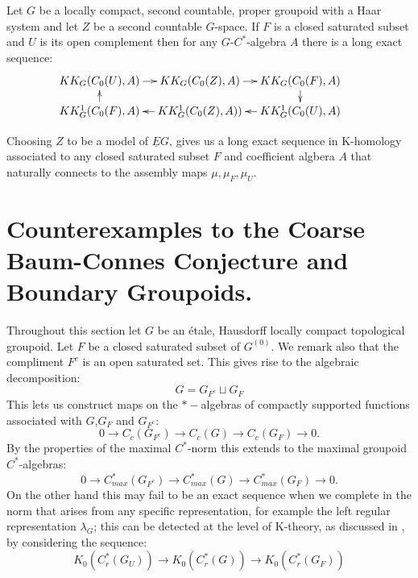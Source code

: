 \begin{conjecture}
{\begin{lemma}
Let $G$ be a locally compact, second countable, proper groupoid with a Haar system and let $Z$ be a second countable $G$-space. If $F$ is a closed saturated subset and $U$ is its open complement then for any $G$-$C^{*}$-algebra $A$ there is a long exact sequence:
\begin{equation*}
\xymatrix@=1em{
KK_{G}(C_{0}(U),A) \ar[r] & KK_{G}(C_{0}(Z),A) \ar[r]& KK_{G}(C_{0}(F),A)\ar[d] & \\
KK^{1}_{G}(C_{0}(F),A)\ar[u]& KK^{1}_{G}(C_{0}(Z),A)) \ar[l]& KK^{1}_{G}(C_{0}(U),A)\ar[l] &
}
\end{equation*}
\end{lemma}

Choosing $Z$ to be a model of $\underline{E}G$, gives us a long exact sequence in K-homology associated to any closed saturated subset $F$ and coefficient algbera $A$ that naturally connects to the assembly maps $\mu, \mu_{F}, \mu_{U}$.

\section{Counterexamples to the Coarse Baum-Connes Conjecture and Boundary Groupoids.}\label{Sect:CE}

Throughout this section let $G$ be an \'etale, Hausdorff locally compact topological groupoid. Let $F$ be a closed saturated subset of $G^{(0)}$. We remark also that the compliment $F^{c}$ is an open saturated set. This gives rise to the algebraic decomposition:
\begin{equation*}
G = G_{F^{c}}\sqcup G_{F}
\end{equation*}
This lets us construct maps on the $*-$algebras of compactly supported functions associated with $G$,$G_{F}$ and $G_{F^{c}}$:
\begin{equation*}
0 \rightarrow C_{c}(G_{F^{c}}) \rightarrow C_{c}(G) \rightarrow C_{c}(G_{F}) \rightarrow 0.
\end{equation*}
By the properties of the maximal $C^{*}$-norm this extends to the maximal groupoid $C^{*}$-algebras:
\begin{equation*}
0 \rightarrow C_{max}^{*}(G_{F^{c}}) \rightarrow C_{max}^{*}(G) \rightarrow C_{max}^{*}(G_{F}) \rightarrow 0.
\end{equation*}
On the other hand this may fail to be an exact sequence when we complete in the norm that arises from any specific representation, for example the left regular representation $\lambda_{G}$; this can be detected at the level of K-theory, as discussed in \cite{MR1911663}, by considering the sequence:
\begin{equation}\label{eqn:neim}
K_{0}(C^{*}_{r}(G_{U}))\rightarrow K_{0}(C^{*}_{r}(G)) \rightarrow K_{0}(C^{*}_{r}(G_{F}))
\end{equation}

}
\end{conjecture}
